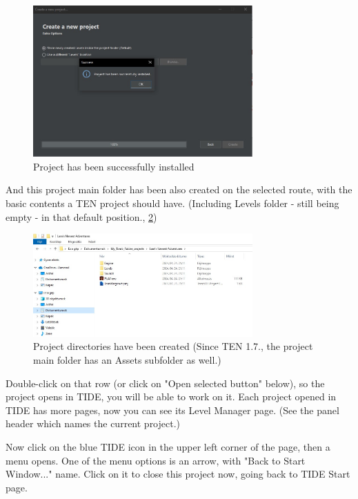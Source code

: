 \begin{figure}
    \centering
     \includegraphics[width=0.75\textwidth]{screenshots/3.jpg}
     \caption{Project has been successfully installed}
     \label{fig:tide3}
\end{figure}

\par And this project main folder has been also created on the selected route, with the basic contents a TEN project should have. (Including Levels folder - still being empty - in that default position., \ref{fig:tide4})

\begin{figure}
    \centering
     \includegraphics[width=0.75\textwidth]{screenshots/4.jpg}
     \caption{Project directories have been created (Since TEN 1.7., the project main folder has an Assets subfolder as well.)}
     \label{fig:tide4}
\end{figure}

Double-click on that row (or click on "Open selected button" below), so the project opens in TIDE, you will be able to work on it. Each project opened in TIDE has more pages, now you can see its Level Manager page. (See the panel header which names the current project.)
\par Now click on the blue TIDE icon in the upper left corner of the page, then a menu opens. One of the menu options is an arrow, with "Back to Start Window..." name. Click on it to close this project now, going back to TIDE Start page.
\cite{akyv_tutorial}


